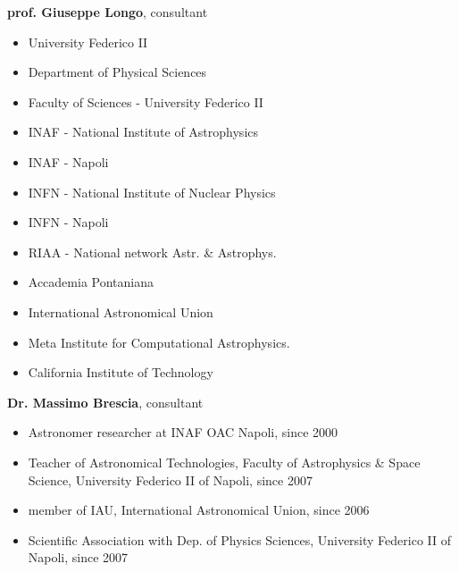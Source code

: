 \documentclass[a4paper,10pt,oneside,onecolumn]{article}
\begin{document}

\bigskip
\noindent \textbf{prof. Giuseppe Longo}, consultant
\begin{multicols}{2}
\begin{itemize} \addtolength{\itemsep}{-0.5\baselineskip}
\item University Federico II
\item Department of Physical Sciences
\item Faculty of Sciences - University Federico II
\item INAF - National Institute of Astrophysics
\item INAF - Napoli
\item INFN - National Institute of Nuclear Physics
\item INFN - Napoli
\item RIAA - National network Astr. \& Astrophys.
\item Accademia Pontaniana
\item International Astronomical Union
\item Meta Institute for Computational Astrophysics.
\item California Institute of Technology
\end{itemize}
\end{multicols}
\bigskip

\noindent \textbf{Dr. Massimo Brescia}, consultant

\begin{itemize}\addtolength{\itemsep}{-0.5\baselineskip}
\item Astronomer researcher at INAF OAC Napoli, since 2000
\item Teacher of Astronomical Technologies, Faculty of Astrophysics \& Space Science, University Federico II of Napoli, since 2007
\item member of IAU, International Astronomical Union, since 2006
\item Scientific Association with Dep. of Physics Sciences, University Federico II of Napoli, since 2007
\end{itemize}

\end{document}
